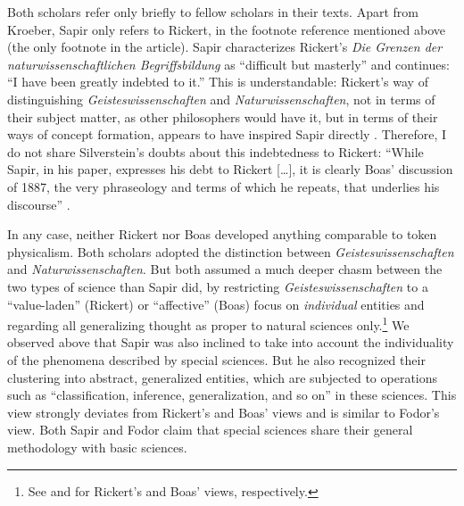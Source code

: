 \documentclass[output=paper]{langscibook}
\begin{document}
Both scholars refer only briefly to fellow scholars in their texts. Apart from Kroeber, Sapir only refers to Rickert, in the footnote reference mentioned above (the only footnote in the article). Sapir characterizes Rickert's \emph{Die Grenzen der naturwissenschaftlichen Begriffsbildung} as ``difficult but masterly'' and continues: ``I have been greatly indebted to it.'' This is understandable: Rickert's way of distinguishing \emph{Geisteswissenschaften} and \emph{Naturwissenschaften}, not in terms of their subject matter, as other philosophers would have it, but in terms of their ways of concept formation, appears to have inspired Sapir directly \citep[cf.][]{Anchor1967}.  Therefore, I do not share Silverstein's doubts about this indebtedness to Rickert: ``While Sapir, in his paper, expresses his debt to Rickert […], it is clearly Boas' discussion of 1887, the very phraseology and terms of which he repeats, that underlies his discourse'' \citep[70, fn.5]{Silverstein1986}.\label{q:elffers:silversteinref}

In any case, neither Rickert nor Boas developed anything comparable to token physicalism. Both scholars adopted the distinction between \emph{Geisteswissenschaften} and \emph{Naturwissenschaften}. But both assumed a much deeper chasm between the two types of science than Sapir did, by restricting \emph{Geisteswissenschaften} to a ``value-laden'' (Rickert) or ``affective'' (Boas) focus on \emph{individual} entities and regarding all generalizing thought as proper to natural sciences only.\footnote{See \citet{Anchor1967}  and \citet{Silverstein1986} for Rickert's and Boas' views, respectively.} We observed above that Sapir was also inclined to take into account the individuality of the phenomena described by special sciences. But he also recognized their clustering into abstract, generalized entities, which are subjected to operations such as ``classification, inference, generalization, and so on'' in these sciences. This view strongly deviates from Rickert's and Boas' views and is similar to Fodor's view. Both Sapir and Fodor claim that special sciences share their general methodology with basic sciences.
\end{document}
